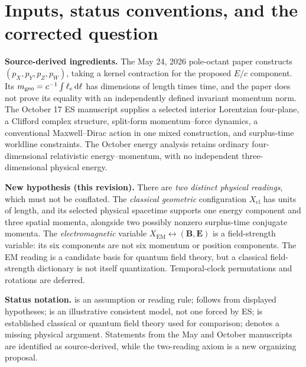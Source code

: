 \documentclass[10.5pt,a4paper]{article}
\newcommand{\dd}{\mathrm d}
\newcommand{\Xcl}{X_{\mathrm{cl}}}
\newcommand{\Xem}{X_{\mathrm{EM}}}
\newcommand{\st}[1]{\textcolor{muted}{\small\sffamily [#1]}}
\begin{document}
\section{Inputs, status conventions, and the corrected question}
\textbf{Source-derived ingredients.} The May 24, 2026 pole-octant paper constructs $(p_X,p_Y,p_Z,p_W)$, taking a kernel contraction for the proposed $E/c$ component. Its $m_{\rm geo}=c^{-1}\int\ell_e\,\dd\ell$ has dimensions of length times time, and the paper does not prove its equality with an independently defined invariant momentum norm. The October 17 ES manuscript supplies a selected interior Lorentzian four-plane, a Clifford complex structure, split-form momentum--force dynamics, a conventional Maxwell--Dirac action in one mixed construction, and surplus-time worldline constraints. The October energy analysis retains ordinary four-dimensional relativistic energy--momentum, with no independent three-dimensional physical energy.

\textbf{New hypothesis (this revision).} There are \emph{two distinct physical readings}, which must not be conflated. The \emph{classical geometric} configuration $\Xcl$ has units of length, and its selected physical spacetime supports one energy component and three spatial momenta, alongside two possibly nonzero surplus-time conjugate momenta. The \emph{electromagnetic} variable $\Xem\leftrightarrow(\mathbf B,\mathbf E)$ is a field-strength variable: its six components are not six momentum or position components. The EM reading is a candidate basis for quantum field theory, but a classical field-strength dictionary is not itself quantization. Temporal-clock permutations and rotations are deferred.

\textbf{Status notation.} \st{Axiom} is an assumption or reading rule; \st{Proved} follows from displayed hypotheses; \st{Constructed} is an illustrative consistent model, not one forced by ES; \st{Standard} is established classical or quantum field theory used for comparison; \st{Open} denotes a missing physical argument. Statements from the May and October manuscripts are identified as source-derived, while the two-reading axiom is a new organizing proposal.
\end{document}
